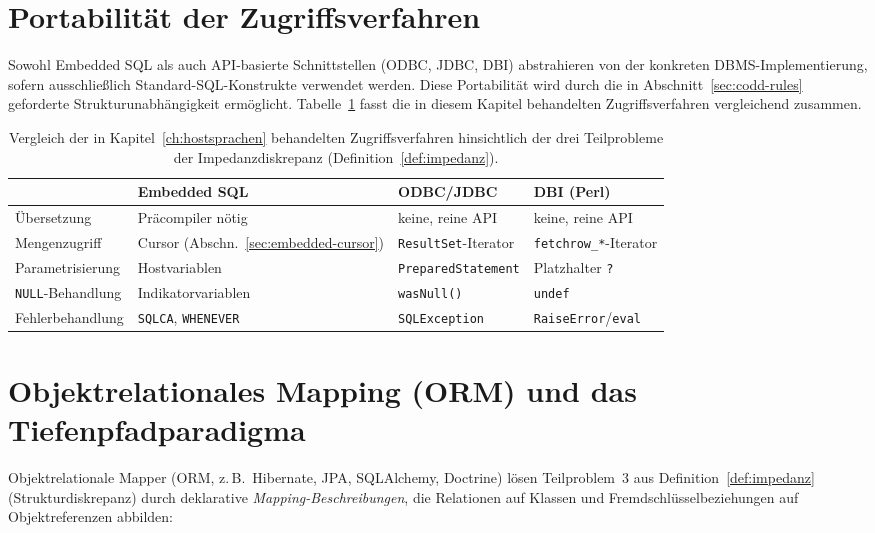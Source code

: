 ﻿\documentclass[a4paper,12pt]{report}
\theoremstyle{definition}
\theoremstyle{remark}
\begin{document}
\section{Portabilität der Zugriffsverfahren}
\label{sec:portabilitaet}

Sowohl Embedded SQL als auch API-basierte Schnittstellen (ODBC, JDBC,
DBI) abstrahieren von der konkreten DBMS-Implementierung, sofern
ausschließlich Standard-SQL-Konstrukte verwendet werden. Diese
Portabilität wird durch die in Abschnitt~\ref{sec:codd-rules}
geforderte Strukturunabhängigkeit ermöglicht. Tabelle~\ref{tab:vergleich-zugriff}
fasst die in diesem Kapitel behandelten Zugriffsverfahren vergleichend
zusammen.

\begin{table}[H]
\centering
\small
\begin{tabular}{@{}lp{3.45cm}p{3.45cm}p{3.45cm}@{}}
\toprule
& \textbf{Embedded SQL} & \textbf{ODBC/JDBC} & \textbf{DBI (Perl)} \\
\midrule
Übersetzung & Präcompiler nötig & keine, reine API & keine, reine API \\
Mengenzugriff & Cursor (Abschn.~\ref{sec:embedded-cursor}) &
  \texttt{ResultSet}-Iterator & \texttt{fetchrow\_*}-Iterator \\
Parametrisierung & Hostvariablen & \texttt{PreparedStatement} &
  Platzhalter \texttt{?} \\
\texttt{NULL}-Behandlung & Indikatorvariablen & \texttt{wasNull()} &
  \texttt{undef} \\
Fehlerbehandlung & \texttt{SQLCA}, \texttt{WHENEVER} &
  \texttt{SQLException} & \texttt{RaiseError}/\texttt{eval} \\
\bottomrule
\end{tabular}
\caption{Vergleich der in Kapitel~\ref{ch:hostsprachen} behandelten
Zugriffsverfahren hinsichtlich der drei Teilprobleme der
Impedanzdiskrepanz (Definition~\ref{def:impedanz}).}
\label{tab:vergleich-zugriff}
\end{table}

\section{Objektrelationales Mapping (ORM) und das Tiefenpfadparadigma}
\label{sec:orm}

Objektrelationale Mapper (ORM, z.\,B.\ Hibernate, JPA, SQLAlchemy,
Doctrine) lösen Teilproblem~3 aus Definition~\ref{def:impedanz}
(Strukturdiskrepanz) durch deklarative \emph{Mapping-Beschreibungen},
die Relationen auf Klassen und Fremdschlüsselbeziehungen auf
Objektreferenzen abbilden:
\end{document}
